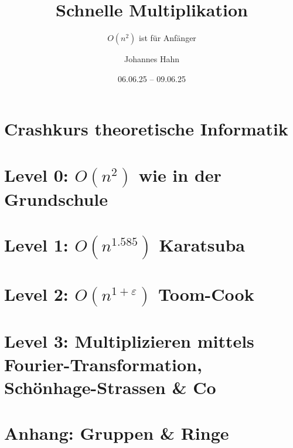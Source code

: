 \documentclass[fontsize=11pt,fleqn,a4paper]{scrartcl}
\author{Johannes Hahn}
\title{Schnelle Multiplikation}
\subtitle{$O(n^2)$ ist für Anfänger}
\date{06.06.25 -- 09.06.25}
\begin{document}
\maketitle

\tableofcontents
\pagebreak

\setcounter{section}{-1}


\section{Crashkurs theoretische Informatik}\label{theory}


\pagebreak


\section{Level 0: $O(n^2)$ wie in der Grundschule}\label{slow_multiplication}




\section{Level 1: $O(n^{1.585})$ Karatsuba}




\section{Level 2: $O(n^{1+\varepsilon})$ Toom-Cook}




\section{Level 3: Multiplizieren mittels Fourier-Transformation, Schönhage-Strassen \& Co}





\pagebreak
\setcounter{section}{98}


\section{Anhang: Gruppen \& Ringe}\label{algebra}



\end{document}
